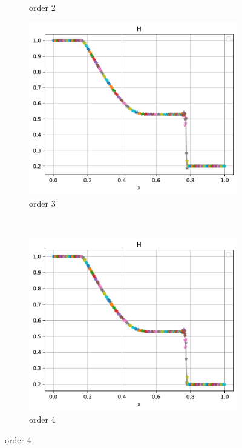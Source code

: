 \documentclass[pt12]{beamer}
\begin{document}
\begin{frame}
\begin{columns}
\begin{column}{0.60\textwidth}
\begin{figure}
\begin{subfigure}[b]{0.40\textwidth}
         \caption{order 2}
     \end{subfigure}
     \begin{subfigure}[b]{0.40\textwidth}
         \centering
         \includegraphics[width=\textwidth]{figures/sod/o3.pdf}
         \caption{order 3}
     \end{subfigure}\\
     \begin{subfigure}[b]{0.40\textwidth}
         \centering
         \includegraphics[width=\textwidth]{figures/sod/o4.pdf}
         \caption{order 4}

\end{subfigure}
\end{figure}
\end{column}
\end{columns}
\end{frame}
\end{document}
